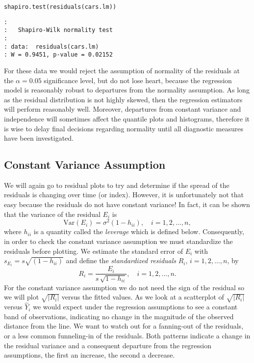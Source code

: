 \begin{verbatim}
shapiro.test(residuals(cars.lm))
\end{verbatim}

\begin{verbatim}
: 
: 	Shapiro-Wilk normality test
: 
: data:  residuals(cars.lm)
: W = 0.9451, p-value = 0.02152
\end{verbatim}

For these data we would reject the assumption of normality of the
residuals at the \(\alpha=0.05\) significance level, but do not lose
heart, because the regression model is reasonably robust to departures
from the normality assumption. As long as the residual distribution is
not highly skewed, then the regression estimators will perform
reasonably well. Moreover, departures from constant variance and
independence will sometimes affect the quantile plots and histograms,
therefore it is wise to delay final decisions regarding normality
until all diagnostic measures have been investigated.

\subsection{Constant Variance Assumption}
\label{sec-11-4-2}

We will again go to residual plots to try and determine if the spread
of the residuals is changing over time (or index). However, it is
unfortunately not that easy because the residuals do not have constant
variance! In fact, it can be shown that the variance of the residual
\(E_{i}\) is
\begin{equation}
\mbox{Var$(E_{i})$}=\sigma^{2}(1-h_{ii}),\quad i=1,2,\ldots,n,
\end{equation}
where \(h_{ii}\) is a quantity called the \emph{leverage} which is defined
below. Consequently, in order to check the constant variance
assumption we must standardize the residuals before plotting. We
estimate the standard error of \(E_{i}\) with
\(s_{E_{i}}=s\sqrt{(1-h_{ii})}\) and define the \emph{standardized
residuals} \(R_{i}\), \(i=1,2,\ldots,n\), by
\begin{equation} 
R_{i}=\frac{E_{i}}{s\,\sqrt{1-h_{ii}}},\quad i=1,2,\ldots,n.
\end{equation}
For the constant variance assumption we do not need the sign of the
residual so we will plot \(\sqrt{|R_{i}|}\) versus the fitted
values. As we look at a scatterplot of \(\sqrt{|R_{i}|}\) versus
\(\hat{Y}_{i}\) we would expect under the regression assumptions to
see a constant band of observations, indicating no change in the
magnitude of the observed distance from the line. We want to watch out
for a fanning-out of the residuals, or a less common funneling-in of
the residuals. Both patterns indicate a change in the residual
variance and a consequent departure from the regression assumptions,
the first an increase, the second a decrease.

